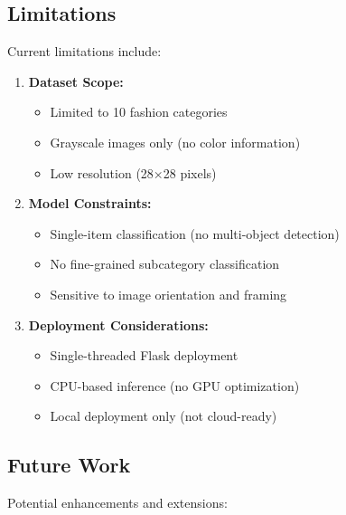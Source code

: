 \documentclass[12pt,a4paper]{article}
\begin{document}
\subsection{Limitations}

Current limitations include:

\begin{enumerate}
    \item \textbf{Dataset Scope:}
    \begin{itemize}
        \item Limited to 10 fashion categories
        \item Grayscale images only (no color information)
        \item Low resolution (28×28 pixels)
    \end{itemize}
    
    \item \textbf{Model Constraints:}
    \begin{itemize}
        \item Single-item classification (no multi-object detection)
        \item No fine-grained subcategory classification
        \item Sensitive to image orientation and framing
    \end{itemize}
    
    \item \textbf{Deployment Considerations:}
    \begin{itemize}
        \item Single-threaded Flask deployment
        \item CPU-based inference (no GPU optimization)
        \item Local deployment only (not cloud-ready)
    \end{itemize}
\end{enumerate}

\subsection{Future Work}

Potential enhancements and extensions:
\end{document}
